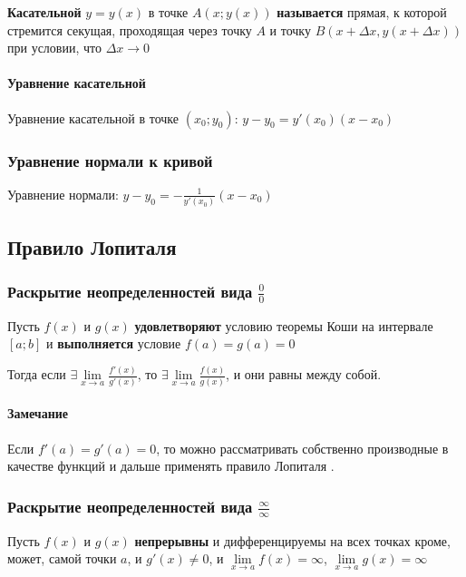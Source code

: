 \documentclass{article}
\begin{document}
\begin{flushleft}

\textbf{Касательной} $y = y(x)$ в точке $A(x; y(x))$ \textbf{называется} прямая, к которой стремится секущая, проходящая через точку $A$ и точку $B (x + \Delta x, y(x + \Delta x))$ при условии, что $\Delta x \to 0$

\paragraph{Уравнение касательной}

Уравнение касательной в точке $(x_0; y_0)$: $y - y_0 = y'(x_0)(x - x_0)$

\subsubsection{Уравнение нормали к кривой}

$\textbf{Уравнение нормали:}$ $y - y_0 = -\frac{1}{y'(x_0)} (x - x_0)$

\subsection{Правило Лопиталя}

\subsubsection{Раскрытие неопределенностей вида $\frac{0}{0}$}

Пусть $f(x)$ и $g(x)$ \textbf{удовлетворяют} условию теоремы Коши на интервале $[ a; b ]$ и \textbf{выполняется} условие $f(a) = g(a) = 0$

Тогда если $\exists \lim\limits_{x \to a} \frac{f'(x)}{g'(x)}$, то $\exists \lim\limits_{x \to a} \frac{f(x)}{g(x)}$, и они равны между собой.

\paragraph{Замечание} Если $f'(a) = g'(a) = 0$, то можно рассматривать собственно производные в качестве функций и дальше применять правило Лопиталя .

\subsubsection{Раскрытие неопределенностей вида $\frac{\infty}{\infty}$}

Пусть $f(x)$ и $g(x)$ \textbf{непрерывны} и дифференцируемы на всех точках кроме, может, самой точки $a$, и $g'(x) \ne 0$, и $\lim\limits_{x \to a} f(x) = \infty$, $\lim\limits_{x \to a} g(x) = \infty$


\end{flushleft}
\end{document}
